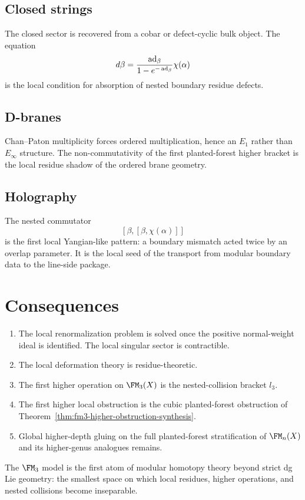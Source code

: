 \subsection*{Closed strings}
The closed sector is recovered from a cobar or defect-cyclic bulk object.
The equation
\[
d\beta = \frac{\operatorname{ad}_\beta}{1-e^{-\operatorname{ad}_\beta}}\chi(\alpha)
\]
is the local condition for absorption of nested boundary residue defects.

\subsection*{D-branes}
Chan--Paton multiplicity forces ordered multiplication, hence an $E_1$ rather
than $E_\infty$ structure. The non-commutativity of the first planted-forest
higher bracket is the local residue shadow of the ordered brane geometry.

\subsection*{Holography}
The nested commutator
\[
[\beta,[\beta,\chi(\alpha)]]
\]
is the first local Yangian-like pattern: a boundary mismatch acted twice by an
overlap parameter. It is the local seed of the transport from modular boundary
data to the line-side package.

\section{Consequences}

\begin{enumerate}[label=\textup{(\arabic*)}]
\item The local renormalization problem is solved once the positive normal-weight
 ideal is identified. The local singular sector is contractible.
\item The local deformation theory is residue-theoretic.
\item The first higher operation on $\FM_3(X)$ is the nested-collision bracket
 $l_3$.
\item The first higher local obstruction is the cubic planted-forest obstruction
 of Theorem~\ref{thm:fm3-higher-obstruction-synthesis}.
\item Global higher-depth gluing on the full planted-forest stratification of
 $\FM_n(X)$ and its higher-genus analogues remains.
\end{enumerate}

The $\FM_3$ model is the first atom of modular homotopy theory beyond strict
dg Lie geometry: the smallest space on which local residues, higher operations,
and nested collisions become inseparable.
